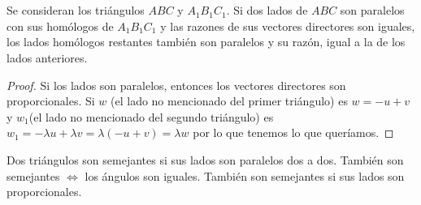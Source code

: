 \begin{nth}\hfill\\
\begin{minipage}[c]{0.50\textwidth}
  \hfill\\
  Se consideran los triángulos $ABC$ y $A_1B_1C_1$. Si dos lados de $ABC$ son paralelos con sus homólogos de $A_1B_1C_1$ y las razones de sus vectores directores son iguales, los lados homólogos restantes también son paralelos y su razón, igual a la de los lados anteriores.
\end{minipage}\hfill
\begin{minipage}[]{0.47\textwidth}
\end{minipage}

  \end{nth}

  \begin{proof}
    Si los lados son paralelos, entonces los vectores directores son proporcionales.
    Si $w$ (el lado no mencionado del primer triángulo) es $w=-u+v$ y $w_1$(el lado no mencionado del segundo triángulo) es $w_1 = - \lambda u + \lambda v = \lambda (-u+v) = \lambda w$  por lo que tenemos lo que queríamos.
  \end{proof}

\begin{ndef}
  Dos triángulos son semejantes si sus lados son paralelos dos a dos. También son semejantes $\iff$ los ángulos son iguales. También son semejantes si sus lados son proporcionales.
\end{ndef}

